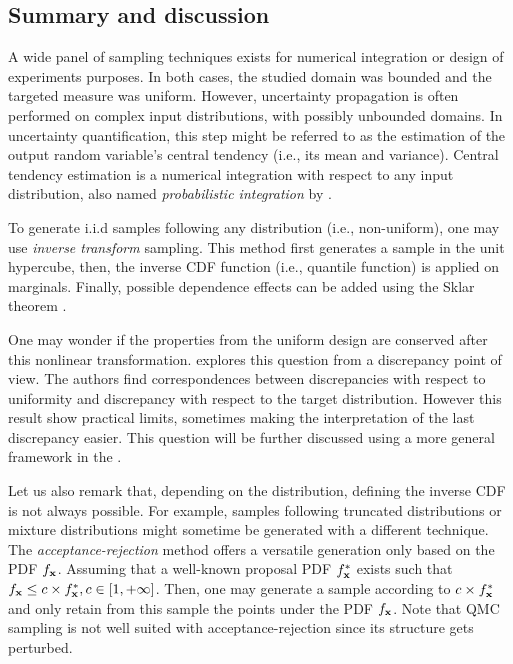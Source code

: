 \subsection{Summary and discussion}


A wide panel of sampling techniques exists for numerical integration or design of experiments purposes. 
In both cases, the studied domain was bounded and the targeted measure was uniform. 
However, uncertainty propagation is often performed on complex input distributions, with possibly unbounded domains. 
In uncertainty quantification, this step might be referred to as the estimation of the output random variable's central tendency (i.e., its mean and variance).
Central tendency estimation is a numerical integration with respect to any input distribution, also named \textit{probabilistic integration} by \citet{briol_oates_2019}.  

To generate i.i.d samples following any distribution (i.e., non-uniform), one may use \textit{inverse transform} sampling.
This method first generates a sample in the unit hypercube, then, the inverse CDF function (i.e., quantile function) is applied on marginals. 
Finally, possible dependence effects can be added using the Sklar theorem .

One may wonder if the properties from the uniform design are conserved after this nonlinear transformation. 
\citet{hickernell_2020} explores this question from a discrepancy point of view. 
The authors find correspondences between discrepancies with respect to uniformity and discrepancy with respect to the target distribution. 
However this result show practical limits, sometimes making the interpretation of the last discrepancy easier. 
This question will be further discussed using a more general framework in the .

Let us also remark that, depending on the distribution, defining the inverse CDF is not always possible.
For example, samples following truncated distributions or mixture distributions might sometime be generated with a different technique. 
The \textit{acceptance-rejection} method offers a versatile generation only based on the PDF $f_{{\bf x}}$.
Assuming that a well-known proposal PDF $f^*_{{\bf x}}$ exists such that $f_{{\bf x}} \leq c \times f^*_{{\bf x}}, c \in [1, +\infty]$. 
Then, one may generate a sample according to $c \times f^*_{{\bf x}}$ and only retain from this sample the points under the PDF $f_{{\bf x}}$.
Note that QMC sampling is not well suited with acceptance-rejection since its structure gets perturbed. 

